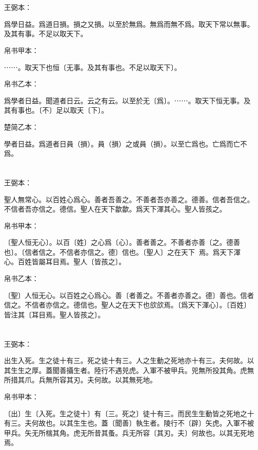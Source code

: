 \documentclass[a5paper]{ctexbook}
\begin{document}
    \chapter{}
    王弼本：

    爲學日益。爲道日損。損之又損。以至於無爲。無爲而無不爲。取天下常以無事。及其有事。不足以取天下。

    
    帛书甲本：

    ⋯⋯。取天下也恒〔无事。及其有事也。不足以取天下〕。

    帛书乙本：

    爲學者日益。聞道者日云。云之有云。以至於无〔爲〕。⋯⋯。取天下恒无事。及其有事也。〔不〕足以取天〔下〕。

    楚简乙本：

    學者日益。爲道者日員（損）。員（損）之或員（損）。以至亡爲也。亡爲而亡不爲。

    \chapter{}
    王弼本：

    聖人無常心。以百姓心爲心。善者吾善之。不善者吾亦善之。德善。信者吾信之。不信者吾亦信之。德信。聖人在天下歙歙。爲天下渾其心。聖人皆孩之。

    
    帛书甲本：

    〔聖人恒无心〕。以百〔姓〕之心爲〔心〕。善者善之。不善者亦善〔之。德善也〕。〔信者信之。不信者亦信之。德〕信也。〔聖人〕之在天下𢡁𢡁焉。爲天下渾心。百姓皆屬耳目焉。聖人〔皆孩之〕。

    帛书乙本：

    〔聖〕人恒无心。以百姓之心爲心。善〔者善之。不善者亦善之。德〕善也。信者信之。不信者亦信之。德信也。聖人之在天下也欱欱焉。〔爲天下渾心〕。〔百姓〕皆注其〔耳目焉。聖人皆孩之〕。

    \chapter{}
    王弼本：

    出生入死。生之徒十有三。死之徒十有三。人之生動之死地亦十有三。夫何故。以其生生之厚。蓋聞善攝生者。陸行不遇兕虎。入軍不被甲兵。兕無所投其角。虎無所措其爪。兵無所容其刃。夫何故。以其無死地。

    
    帛书甲本：

    〔出〕生〔入死。生之徒十〕有〔三。死之〕徒十有三。而民生生動皆之死地之十有三。夫何故也。以其生生也。蓋〔聞善〕執生者。陵行不〔辟〕矢虎。入軍不被甲兵。矢无所椯其角。虎无所昔其蚤。兵无所容〔其刃。夫〕何故也。以其无死地焉。
\end{document}
